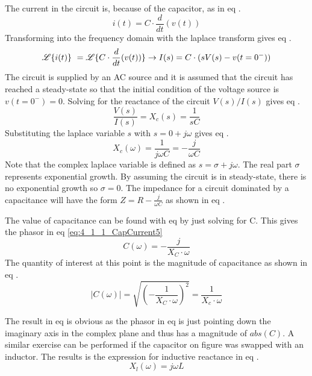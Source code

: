The current in the circuit is, because of the capacitor, as in eq .
\begin{equation}\label{eq:4_1_1_CapCurrent}
    i(t) = C\cdot\frac{d}{dt} (v(t))
\end{equation}
Transforming  into the frequency domain with the laplace transform gives eq .
\begin{equation}\label{eq:4_1_1_CapCurrent2}
    \mathscr{L}\{\/i(t)\}\ = \mathscr{L}\{\/C\cdot\frac{d}{dt} (v(t))\} \rightarrow I(s) = C\cdot(sV(s) - v(t=0^-))
\end{equation}
The circuit is supplied by an AC source and it is assumed that the circuit has reached a steady-state so that the initial condition of the voltage source is $v(t=0^-) = 0$. Solving for the reactance of the circuit $V(s) / I(s)$ gives eq .
\begin{equation}\label{eq:4_1_1_CapCurrent3}
    \frac{V(s)}{I(s)} =X_c(s)= \frac{1}{sC}
\end{equation}
Substituting the laplace variable $s$ with $s = 0 + j\omega$ gives eq .
\begin{equation}\label{eq:4_1_1_CapCurrent4}
    X_c(\omega) = \frac{1}{j\omega C}=-\frac{j}{\omega C}
\end{equation}
Note that the complex laplace variable is defined as $s = \sigma + j\omega$. The real part $\sigma$ represents exponential growth. By assuming the circuit is in steady-state, there is no exponential growth so $\sigma = 0$. The impedance for a circuit dominated by a capacitance will have the form $Z = R -\frac{j}{\omega C}$ as shown in eq .

The value of capacitance can be found with eq  by just solving for C. This gives the phasor in eq \ref{eq:4_1_1_CapCurrent5}
\begin{equation}\label{eq:4_1_1_CapCurrent5}
    C(\omega)=-\frac{j}{X_C\cdot \omega}
\end{equation}
The quantity of interest at this point is the magnitude of capacitance as shown in eq .
\begin{equation}\label{eq:4_1_1_CapCurrent6}
    |C(\omega)|= \sqrt{\left(-\frac{1}{X_C\cdot \omega}\right)^2} =\frac{1}{X_c\cdot \omega} 
\end{equation}

The result in eq  is obvious as the phasor in eq  is just pointing down the imaginary axis in the complex plane and thus has a magnitude of $abs(C)$. A similar exercise can be performed if the capacitor on figure  was swapped with an inductor. The results is the expression for inductive reactance in eq .
\begin{equation}\label{eq:4_1_1_IndReactance}
    X_l(\omega) = j \omega L
\end{equation}

